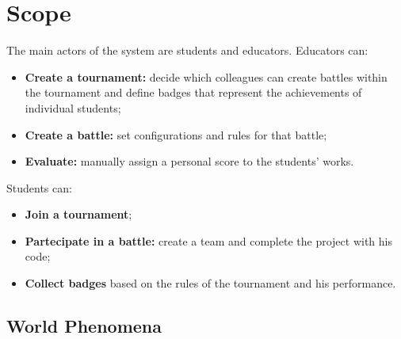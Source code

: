 \section{Scope}
The main actors of the system are students and educators. Educators can:
\begin{itemize}
    \item \textbf{Create a tournament:} decide which colleagues can create battles within the tournament and define badges 
    that represent the achievements of individual students; 
    \item \textbf{Create a battle:} set configurations and rules for that battle;
    \item \textbf{Evaluate:} manually assign a personal score to the students' works.
\end{itemize}

Students can:
\begin{itemize}
    \item \textbf{Join a tournament};
    \item \textbf{Partecipate in a battle:} create a team and complete the project with his code;
    \item \textbf{Collect badges} based on the rules of the tournament and his performance.
\end{itemize}

\subsection{World Phenomena}

\begin{table}[H]
    \centering
    \end{table}
    \clearpage

